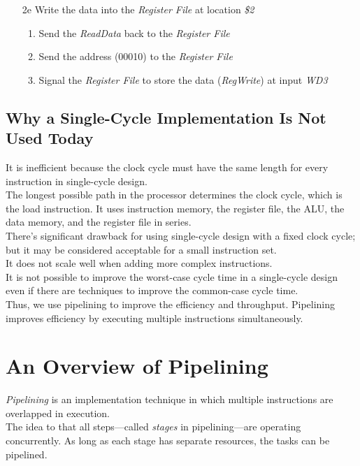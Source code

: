 \documentclass[12pt]{article}
\theoremstyle{definition}
\begin{document}
\begin{enumerate}
\begin{enumerate}
    \end{enumerate}
    \item[2e] Write the data into the \emph{Register File} at location \emph{\$2}
    \begin{enumerate}
      \item Send the \emph{ReadData} back to the \emph{Register File}
      \item Send the address (00010) to the \emph{Register File}
      \item Signal the \emph{Register File} to store the data (\emph{RegWrite}) at input \emph{WD3}
    \end{enumerate}
  \end{enumerate}

  \subsection{Why a Single-Cycle Implementation Is Not Used Today}
  It is inefficient because the clock cycle must have the same length for every instruction in single-cycle design. \\
  The longest possible path in the processor determines the clock cycle, which is the load instruction.
  It uses instruction memory, the register file, the ALU, the data memory, and the register file in series. \\

  There's significant drawback for using single-cycle design with a fixed clock cycle; but it may be considered acceptable for a small instruction set. \\
  It does not scale well when adding more complex instructions. \\
  It is not possible to improve the worst-case cycle time in a single-cycle design even if there are techniques to improve the common-case cycle time. \\

  Thus, we use pipelining to improve the efficiency and throughput.
  Pipelining improves efficiency by executing multiple instructions simultaneously.

  \section{An Overview of Pipelining}
  \emph{Pipelining} is an implementation technique in which multiple instructions are overlapped in execution. \\
  The idea to that all steps---called \emph{stages} in pipelining---are operating concurrently.
  As long as each stage has separate resources, the tasks can be pipelined. \\
\end{document}
